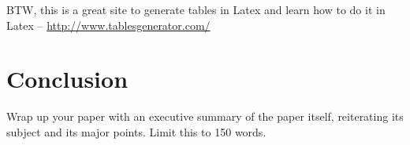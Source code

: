 \documentclass{article}
\begin{document}
BTW, this is a great site to generate tables in Latex and learn how to do it in Latex -- \url{http://www.tablesgenerator.com/}


\section{Conclusion}

Wrap up your paper with an executive summary of the paper itself, reiterating its subject and its major points. Limit this to 150 words.
\end{document}
